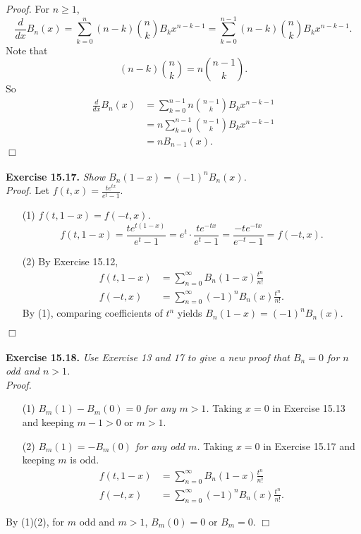 \documentclass{article}
\begin{document}
\emph{Proof.}
For $n \geq 1$,
$$\frac{d}{dx}B_n(x)
= \sum_{k=0}^{n}(n - k) {n \choose k} B_k x^{n - k - 1}
= \sum_{k=0}^{n-1}(n - k) {n \choose k} B_k x^{n - k - 1}.$$
Note that
$$(n-k) {n \choose k} = n {n-1 \choose k}.$$
So
\begin{align*}
\frac{d}{dx}B_n(x)
&= \sum_{k=0}^{n-1} n {n-1 \choose k} B_k x^{n - k - 1} \\
&= n \sum_{k=0}^{n-1} {n-1 \choose k} B_k x^{n - k - 1} \\
&= n B_{n-1}(x).
\end{align*}
$\Box$ \\\\



\textbf{Exercise 15.17.}
\emph{Show $B_n(1-x) = (-1)^n B_n(x)$.} \\

\emph{Proof.}
Let $f(t, x) = \frac{te^{tx}}{e^t - 1}$.
\begin{enumerate}
\item[(1)]
\emph{$f(t, 1-x) = f(-t, x)$.}
$$f(t, 1-x)
= \frac{te^{t(1-x)}}{e^t - 1}
= e^t \cdot \frac{te^{-tx}}{e^t - 1}
= \frac{-te^{-tx}}{e^{-t} - 1} = f(-t, x).$$
\item[(2)]
By Exercise 15.12,
\begin{align*}
f(t, 1-x)
&= \sum_{n=0}^{\infty} B_n(1-x) \frac{t^n}{n!} \\
f(-t, x)
&= \sum_{n=0}^{\infty} (-1)^n B_n(x) \frac{t^n}{n!}.
\end{align*}
By (1), comparing coefficients of $t^n$ yields
$B_n(1-x) = (-1)^n B_n(x)$.
\end{enumerate}
$\Box$ \\\\



\textbf{Exercise 15.18.}
\emph{Use Exercise 13 and 17 to give a new proof that
$B_n = 0$ for $n$ odd and $n > 1$.} \\

\emph{Proof.}
\begin{enumerate}
\item[(1)]
\emph{$B_m(1) - B_m(0) = 0$ for any $m > 1$.}
Taking $x = 0$ in Exercise 15.13 and keeping $m - 1 > 0$ or $m > 1$.
\item[(2)]
\emph{$B_m(1) = -B_m(0)$ for any odd $m$.}
Taking $x = 0$ in Exercise 15.17 and keeping $m$ is odd.
\begin{align*}
f(t, 1-x)
&= \sum_{n=0}^{\infty} B_n(1-x) \frac{t^n}{n!} \\
f(-t, x)
&= \sum_{n=0}^{\infty} (-1)^n B_n(x) \frac{t^n}{n!}.
\end{align*}
\end{enumerate}
By (1)(2), for $m$ odd and $m > 1$, $B_m(0) = 0$ or $B_m = 0$.
$\Box$ \\\\
\end{document}
